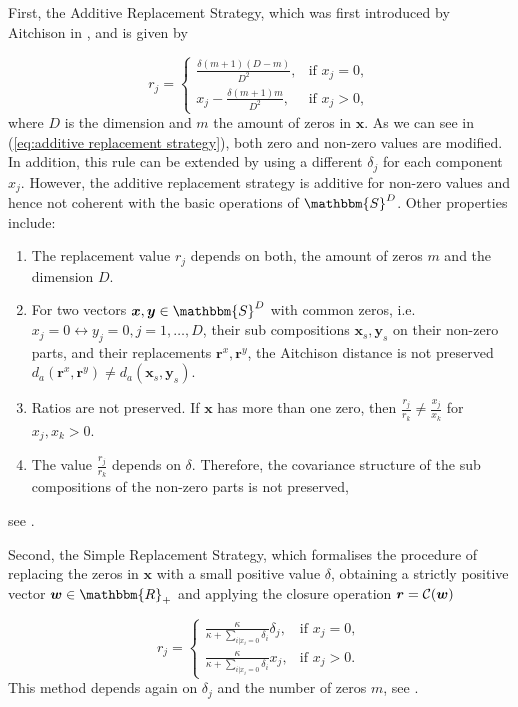 First, the Additive Replacement Strategy, which was first introduced by Aitchison in \textcite{Aitchison:1986}, and is given by

\begin{equation}
r_j = 
\begin{cases}
\frac{\delta(m+1)(D-m)}{D^2}, & \text{if } x_j=0, \\
x_j - \frac{\delta(m+1)m}{D^2}, & \text{if } x_j>0,
\end{cases}
\label{eq:additive replacement strategy}
\end{equation}
%
where $D$ is the dimension and $m$ the amount of zeros in $\bm{x}$. 
As we can see in (\ref{eq:additive replacement strategy}), both zero and non-zero values are modified. In addition, this rule can be extended by using a different $\delta_j$ for each component $x_j$. However, the additive replacement strategy is additive for non-zero values and hence not coherent with the basic operations of $\mathbbm{S}^D$. Other properties include:

\begin{enumerate}
	\item The replacement value $r_j$ depends on both, the amount of zeros $m$ and the dimension $D$.
	\item For two vectors $\bm{x},\bm{y} \in \mathbbm{S}^D$ with common zeros, i.e. $x_j= 0 \leftrightarrow y_j=0, j=1,\ldots,D$, their sub compositions $\bm{x}_s,\bm{y}_s$  on their non-zero parts, and their replacements $\bm{r}^x,\bm{r}^y$, the Aitchison distance is not preserved $d_a(\bm{r}^x,\bm{r}^y) \neq d_a(\bm{x}_s,\bm{y}_s)$. 
	\item Ratios are not preserved. If $\bm{x}$ has more than one zero, then $\frac{r_j}{r_k} \neq \frac{x_j}{x_k}$ for $x_j,x_k > 0$.
	\item The value $\frac{r_j}{r_k}$ depends on $\delta$. Therefore, the covariance structure of the sub compositions of the non-zero parts is not preserved, 
\end{enumerate}
see \textcite{Josep:2003}. 

Second, the Simple Replacement Strategy, which formalises the procedure of replacing the zeros in $\bm{x}$ with a small positive value $\delta$, obtaining a strictly positive vector $\bm{w} \in \mathbbm{R}_+$ and applying the closure operation $\bm{r}=\mathcal{C}(\bm{w})$

\begin{equation}
r_j = 
\begin{cases}
\frac{\kappa}{\kappa + \sum_{i| x_i=0}\delta_i } \delta_j, & \text{if } x_j=0, \\
\frac{\kappa}{\kappa + \sum_{i| x_i=0}\delta_i } x_j, & \text{if } x_j>0.
\end{cases}
\label{eq:simple replacement strategy}
\end{equation}
%
This method depends again on $\delta_j$ and the number of zeros $m$, see \textcite{Josep:2003}. 

